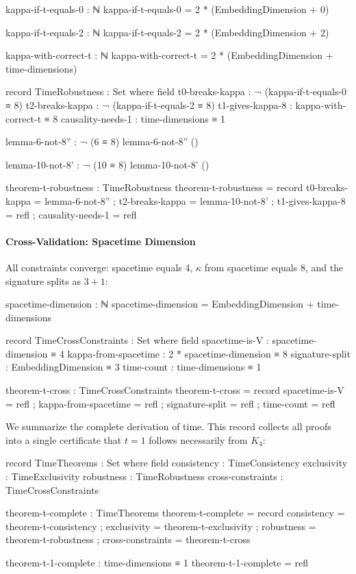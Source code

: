 \documentclass[11pt,a4paper]{book}
\begin{document}
\begin{code}
kappa-if-t-equals-0 : ℕ
kappa-if-t-equals-0 = 2 * (EmbeddingDimension + 0)

kappa-if-t-equals-2 : ℕ
kappa-if-t-equals-2 = 2 * (EmbeddingDimension + 2)

kappa-with-correct-t : ℕ
kappa-with-correct-t = 2 * (EmbeddingDimension + time-dimensions)

record TimeRobustness : Set where
  field
    t0-breaks-kappa   : ¬ (kappa-if-t-equals-0 ≡ 8)
    t2-breaks-kappa   : ¬ (kappa-if-t-equals-2 ≡ 8)
    t1-gives-kappa-8  : kappa-with-correct-t ≡ 8
    causality-needs-1 : time-dimensions ≡ 1

lemma-6-not-8'' : ¬ (6 ≡ 8)
lemma-6-not-8'' ()

lemma-10-not-8' : ¬ (10 ≡ 8)
lemma-10-not-8' ()

theorem-t-robustness : TimeRobustness
theorem-t-robustness = record
  { t0-breaks-kappa   = lemma-6-not-8''
  ; t2-breaks-kappa   = lemma-10-not-8'
  ; t1-gives-kappa-8  = refl
  ; causality-needs-1 = refl
  }
\end{code}

\paragraph{Cross-Validation: Spacetime Dimension}

All constraints converge: spacetime equals 4, $\kappa$ from spacetime equals 8, and the 
signature splits as $3 + 1$:

\begin{code}
spacetime-dimension : ℕ
spacetime-dimension = EmbeddingDimension + time-dimensions

record TimeCrossConstraints : Set where
  field
    spacetime-is-V       : spacetime-dimension ≡ 4
    kappa-from-spacetime : 2 * spacetime-dimension ≡ 8
    signature-split      : EmbeddingDimension ≡ 3
    time-count           : time-dimensions ≡ 1

theorem-t-cross : TimeCrossConstraints
theorem-t-cross = record
  { spacetime-is-V       = refl
  ; kappa-from-spacetime = refl
  ; signature-split      = refl
  ; time-count           = refl
  }
\end{code}

We summarize the complete derivation of time. This record collects all proofs into a single 
certificate that $t = 1$ follows necessarily from $K_4$:

\begin{code}
record TimeTheorems : Set where
  field
    consistency       : TimeConsistency
    exclusivity       : TimeExclusivity
    robustness        : TimeRobustness
    cross-constraints : TimeCrossConstraints

theorem-t-complete : TimeTheorems
theorem-t-complete = record
  { consistency       = theorem-t-consistency
  ; exclusivity       = theorem-t-exclusivity
  ; robustness        = theorem-t-robustness
  ; cross-constraints = theorem-t-cross
  }

theorem-t-1-complete : time-dimensions ≡ 1
theorem-t-1-complete = refl
\end{code}
\end{document}
